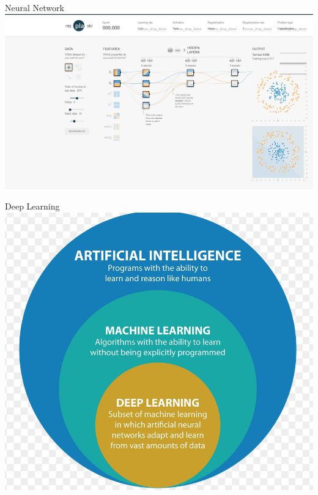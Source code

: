 \documentclass{beamer}{}
\begin{document}
    \begin{frame} {Neural Network}
        \center\includegraphics[width=\textwidth]{img/3.png}
    \end{frame}
    \begin{frame} {Deep Learning}
        \center\includegraphics[width=\textwidth]{img/6.png}
    \end{frame}
\end{document}
